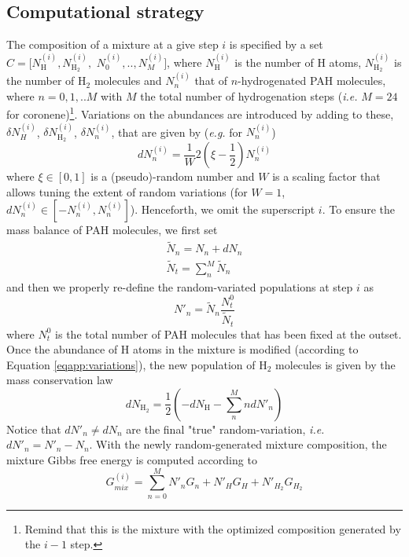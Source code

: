 \documentclass[a4paper, 11pt, twoside]{book}
\begin{document}
\subsection*{Computational strategy}
The composition of a mixture at a give step $i$ is specified by a set $C=[N^{(i)}_{\text{H}}, N^{(i)}_{\text{H}_2}, $ $N^{(i)}_0, .., N^{(i)}_M]$, where $N^{(i)}_{\text{H}}$ is  the number of H atoms, $N^{(i)}_{\text{H}_2}$ is the number of $\text{H}_2$ molecules and $N^{(i)}_n$ that of $n$-hydrogenated PAH molecules, where $n=0,1,..M$ with $M$ the total number of hydrogenation steps (\emph{i.e.} $M=24$ for coronene)\footnote{Remind that this is the mixture with the optimized composition generated by the $i-1$ step.}. Variations on the abundances are introduced by adding to these, $\delta N^{(i)}_H$, $\delta N^{(i)}_{\text{H}_2}$, $\delta N^{(i)}_n$, that are given by (\emph{e.g.} for $N^{(i)}_n$)
\begin{equation}
dN^{(i)}_n = \frac{1}{W}2\left( \xi - \frac{1}{2} \right)N^{(i)}_n \label{eqapp:variations}
\end{equation}
where $\xi \in [ 0,1]$ is a (pseudo)-random number and $W$ is a scaling factor that allows tuning the extent of random variations (for $W=1$, $dN^{(i)}_n\in [ -N^{(i)}_n, N^{(i)}_n]$). Henceforth, we omit the superscript $i$. To ensure the mass balance of PAH molecules, we first set
\begin{gather*}
\tilde{N}_n = N_n + dN_n \\
\tilde{N}_t = \sum_n^M \tilde{N}_n
\end{gather*}
and then we properly re-define the random-variated populations at step $i$ as 
\begin{equation}
N'_n = \tilde{N}_n \frac{N^0_t}{\tilde{N}_t}
\end{equation}
where $N^0_t$ is the total number of PAH molecules that has been fixed at the outset. Once the abundance of H atoms in the mixture is modified (according to Equation \eqref{eqapp:variations}), the new population of $\text{H}_2$ molecules is given by the mass conservation law
\begin{equation}
dN_{\text{H}_2}  = \frac{1}{2} \left( -dN_{\text{H}} - \sum_n^M ndN'_n \right)
\end{equation}
Notice that $dN'_n \neq dN_n$ are the final "true" random-variation, \emph{i.e.} $dN'_n = N'_n - N_n$. With the newly random-generated mixture composition, the mixture Gibbs free energy is computed according to
\begin{equation}
    G_{mix}^{(i)} = \sum_{n=0}^MN'_nG_n+N'_{H}G_{H}+N'_{H_2}G_{H_2} \nonumber
\end{equation}
\end{document}
